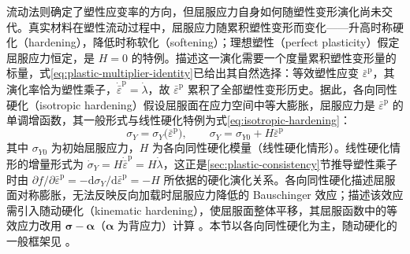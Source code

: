 流动法则确定了塑性应变率的方向，但屈服应力自身如何随塑性变形演化尚未交代。真实材料在塑性流动过程中，屈服应力随累积塑性变形而变化——升高时称硬化（hardening），降低时称软化（softening）；理想塑性（perfect plasticity）假定屈服应力恒定，是 $H=0$ 的特例。描述这一演化需要一个度量累积塑性变形量的标量，式\eqref{eq:plastic-multiplier-identity}已给出其自然选择：等效塑性应变 $\bar{\varepsilon}^{\mathrm{p}}$，其演化率恰为塑性乘子，$\dot{\bar{\varepsilon}}^{\mathrm{p}}=\dot{\lambda}$，故 $\bar{\varepsilon}^{\mathrm{p}}$ 累积了全部塑性变形历史。据此，各向同性硬化（isotropic hardening）假设屈服面在应力空间中等大膨胀，屈服应力是 $\bar{\varepsilon}^{\mathrm{p}}$ 的单调增函数，其一般形式与线性硬化特例为式\eqref{eq:isotropic-hardening}：
\begin{equation}
  \sigma_{Y}=\sigma_{Y}\bigl(\bar{\varepsilon}^{\mathrm{p}}\bigr),\qquad
  \sigma_{Y}=\sigma_{Y0}+H\bar{\varepsilon}^{\mathrm{p}}
  \label{eq:isotropic-hardening}
\end{equation}
其中 $\sigma_{Y0}$ 为初始屈服应力，$H$ 为各向同性硬化模量（线性硬化情形）。线性硬化情形的增量形式为 $\dot{\sigma}_{Y}=H\dot{\bar{\varepsilon}}^{\mathrm{p}}=H\dot{\lambda}$，这正是\ref{sec:plastic-consistency}节推导塑性乘子时由 $\partial f/\partial\bar{\varepsilon}^{\mathrm{p}}=-\mathrm{d}\sigma_{Y}/\mathrm{d}\bar{\varepsilon}^{\mathrm{p}}=-H$ 所依据的硬化演化关系。各向同性硬化描述屈服面对称膨胀，无法反映反向加载时屈服应力降低的 Bauschinger 效应；描述该效应需引入随动硬化（kinematic hardening），使屈服面整体平移，其屈服函数中的等效应力改用 $\boldsymbol{\sigma}-\boldsymbol{\alpha}$（$\boldsymbol{\alpha}$ 为背应力）计算 \cite{Hill1950,SimoHughes1998}。本节以各向同性硬化为主，随动硬化的一般框架见 \cite{Pirzadeh2024}。

